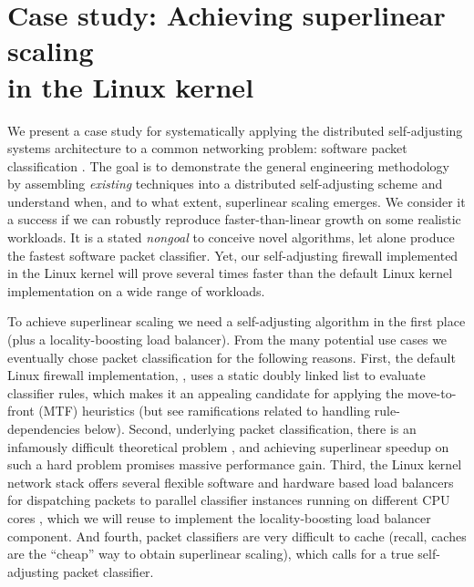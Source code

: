 \section{Case study: Achieving superlinear scaling\\ in the Linux kernel}\label{sec:case-study}

We present a case study for systematically applying the distributed self-adjusting systems architecture to a common networking problem: software packet classification \cite{gupta2001algorithms}. The goal is to demonstrate the general engineering methodology by assembling \emph{existing} techniques into a distributed self-adjusting scheme and understand when, and to what extent, superlinear scaling emerges. We consider it a success if we can robustly reproduce faster-than-linear growth on some realistic workloads. It is a stated \emph{nongoal} to conceive novel algorithms, let alone produce the fastest software packet classifier. %
Yet, our self-adjusting firewall implemented in the Linux kernel will prove several times faster than the default Linux kernel implementation on a wide range of workloads.

To achieve superlinear scaling we need a self-adjusting algorithm in the first place (plus a locality-boosting load balancer). From the many potential use cases %
\cite{SleatorT85Splay, BentleyCL93, HesterH85, HesterH85, BentleySTW86, Avin0020, ParkM12} we eventually chose packet classification for the following reasons.  First, the default Linux firewall implementation, \nftables, uses a static doubly linked list to evaluate classifier rules, which makes it an appealing candidate for applying the move-to-front (MTF) heuristics (but see ramifications related to handling rule-dependencies below). %
Second, underlying packet classification, there is an infamously difficult theoretical problem \cite{10.1145/2619239.2626294,10.1006/jagm.1996.0063, PacutVAPRS2022, 10.1145/2619239.2626294, 10.1145/1851182.1851208, 10.1145/863955.863980, gupta2001algorithms}, %
and achieving superlinear speedup on such a hard problem promises massive performance gain. Third, the Linux kernel network stack offers several flexible software and hardware based load balancers for dispatching packets to parallel classifier instances running on different CPU cores \cite{rss-linux}, which we will reuse to implement the locality-boosting load balancer component. And fourth, packet classifiers are very difficult to cache \cite{1354643} (recall, caches are the ``cheap'' way to obtain superlinear scaling), which calls for a true self-adjusting packet classifier. %

